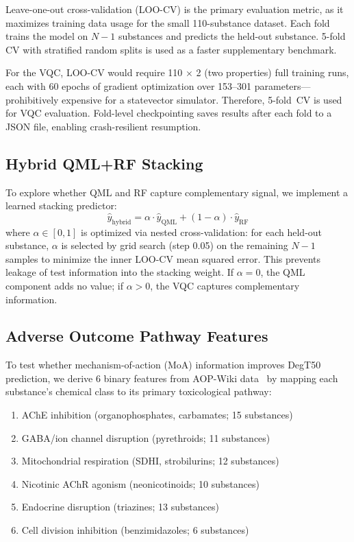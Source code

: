 \documentclass[12pt,a4paper]{article}
\newcommand{\degtl}{DegT50}
\newcommand{\loocv}{LOO-CV}
\newcommand{\nsub}{110}
\begin{document}
Leave-one-out cross-validation (\loocv{}) is the primary evaluation metric,
as it maximizes training data usage for the small \nsub{}-substance dataset.
Each fold trains the model on $N-1$ substances and predicts the held-out
substance. 5-fold CV with stratified random splits is used as a faster
supplementary benchmark.

For the VQC, \loocv{} would require \nsub{} $\times$ 2 (two properties)
full training runs, each with 60 epochs of gradient optimization over
153--301 parameters---prohibitively expensive for a statevector simulator.
Therefore, 5-fold~CV is used for VQC evaluation. Fold-level checkpointing
saves results after each fold to a JSON file, enabling crash-resilient
resumption.


\subsection{Hybrid QML+RF Stacking}
\label{sec:hybrid}

To explore whether QML and RF capture complementary signal, we implement
a learned stacking predictor:
\begin{equation}
  \hat{y}_\text{hybrid} = \alpha \cdot \hat{y}_\text{QML} +
                           (1 - \alpha) \cdot \hat{y}_\text{RF}
\end{equation}
where $\alpha \in [0, 1]$ is optimized via nested cross-validation:
for each held-out substance, $\alpha$ is selected by grid search
(step 0.05) on the remaining $N-1$ samples to minimize the inner
\loocv{} mean squared error. This prevents leakage of test information
into the stacking weight. If $\alpha = 0$, the QML
component adds no value; if $\alpha > 0$, the VQC captures complementary
information.


\subsection{Adverse Outcome Pathway Features}
\label{sec:aop}

To test whether mechanism-of-action (MoA) information improves \degtl{}
prediction, we derive 6 binary features from AOP-Wiki
data~\cite{aopwiki2024, villeneuve2014} by mapping each substance's
chemical class to its primary toxicological pathway:

\begin{enumerate}[nosep]
  \item AChE inhibition (organophosphates, carbamates; 15 substances)
  \item GABA/ion channel disruption (pyrethroids; 11 substances)
  \item Mitochondrial respiration (SDHI, strobilurins; 12 substances)
  \item Nicotinic AChR agonism (neonicotinoids; 10 substances)
  \item Endocrine disruption (triazines; 13 substances)
  \item Cell division inhibition (benzimidazoles; 6 substances)
\end{enumerate}
\end{document}
